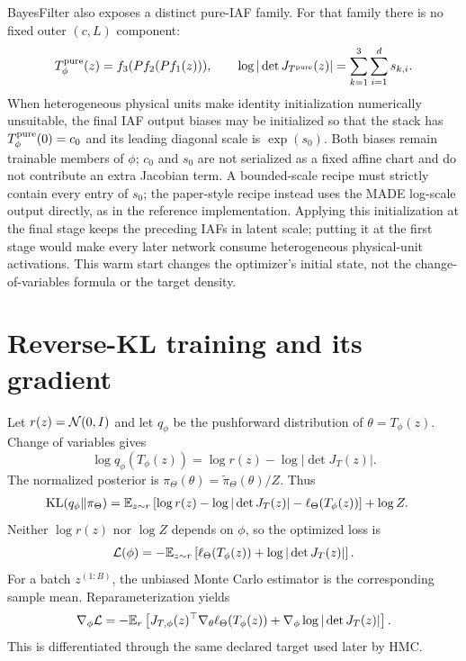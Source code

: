 BayesFilter also exposes a distinct pure-IAF family.  For that family there is
no fixed outer $(c,L)$ component:
\begin{equation}
 T^{\rm pure}_\phi(z)=f_3(Pf_2(Pf_1(z))),\qquad
 \log|\det J_{T^{\rm pure}}(z)|=
 \sum_{k=1}^3\sum_{i=1}^d s_{k,i}.
 \label{eq:bf-neutra-pure-stack}
\end{equation}
When heterogeneous physical units make identity initialization numerically
unsuitable, the final IAF output biases may be initialized so that the stack
has $T^{\rm pure}_\phi(0)=c_0$ and its leading diagonal scale is
$\exp(s_0)$.  Both biases remain trainable members of $\phi$; $c_0$ and $s_0$
are not serialized as a fixed affine chart and do not contribute an extra
Jacobian term.  A bounded-scale recipe must strictly contain every entry of
$s_0$; the paper-style recipe instead uses the MADE log-scale output directly,
as in the reference implementation.  Applying this initialization at the final stage keeps the preceding
IAFs in latent scale; putting it at the first stage would make every later
network consume heterogeneous physical-unit activations.  This warm start
changes the optimizer's initial state, not the change-of-variables formula or
the target density.

\section{Reverse-KL training and its gradient}
\label{sec:bf-neutra-training}

Let $r(z)=\mathcal{N}(0,I)$ and let $q_\phi$ be the pushforward distribution of
$\theta=T_\phi(z)$.  Change of variables gives
\begin{equation}
 \log q_\phi(T_\phi(z))=\log r(z)-\log|\det J_T(z)|.
\end{equation}
The normalized posterior is
$\pi_\Theta(\theta)=\widetilde\pi_\Theta(\theta)/Z$.  Thus
\begin{align}
 \operatorname{KL}(q_\phi\Vert\pi_\Theta)
 &=\mathbb{E}_{z\sim r}\left[
 \log r(z)-\log|\det J_T(z)|-\ell_\Theta(T_\phi(z))
 \right]+\log Z.
 \label{eq:bf-neutra-reverse-kl-full}
\end{align}
Neither $\log r(z)$ nor $\log Z$ depends on $\phi$, so the optimized loss is
\begin{equation}
 \mathcal L(\phi)=-\mathbb{E}_{z\sim r}\left[
 \ell_\Theta(T_\phi(z))+\log|\det J_T(z)|\right].
 \label{eq:bf-neutra-reverse-kl}
\end{equation}
For a batch $z^{(1:B)}$, the unbiased Monte Carlo estimator is the corresponding
sample mean.  Reparameterization yields
\begin{equation}
 \nabla_\phi\mathcal L=-\mathbb{E}_r\left[
 J_{T,\phi}(z)^\top\nabla_\theta\ell_\Theta(T_\phi(z))+
 \nabla_\phi\log|\det J_T(z)|\right].
\end{equation}
This is differentiated through the same declared target used later by HMC.


